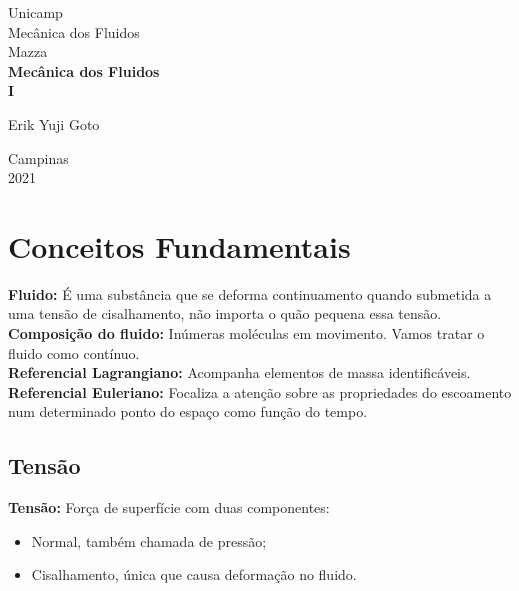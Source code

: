 \documentclass[a4paper, 12pt]{article}
\begin{document}
%
\begin{titlepage} %
	\begin{center} %
		{\large Unicamp}\\[0.2cm] %
		{\large Mecânica dos Fluidos}\\[0.2cm] %
		{\large Mazza}\\[3.2cm]
		{\bf \huge Mecânica dos Fluidos}\\[0.2cm] 
		{\bf \large I}\\[4.9cm]
	\end{center} %
	{\large Erik Yuji Goto}\\[10cm] %
	\begin{center}
		{\large Campinas}\\[0.2cm]
		{\large 2021}
	\end{center}
\end{titlepage} %


\tableofcontents
\newpage

\section{Conceitos Fundamentais}
	\textbf{Fluido:} É uma substância que se deforma continuamento quando submetida a uma tensão de cisalhamento, não importa o quão pequena essa tensão.\\
	
	\textbf{Composição do fluido:} Inúmeras moléculas em movimento. Vamos tratar o fluido como contínuo.\\
	
	\textbf{Referencial Lagrangiano:} Acompanha elementos de massa identificáveis.\\
	
	\textbf{Referencial Euleriano:} Focaliza a atenção sobre as propriedades do escoamento num determinado ponto do espaço como função do tempo.
	
\subsection{Tensão}
	\textbf{Tensão:} Força de superfície com duas componentes:
	\begin{itemize}
		\item Normal, também chamada de pressão;
		\item Cisalhamento, única que causa deformação no fluido.
	\end{itemize}
\end{document}
